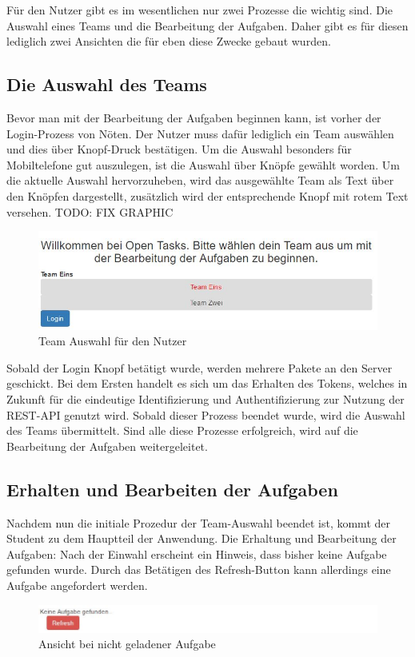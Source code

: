 Für den Nutzer gibt es im wesentlichen nur zwei Prozesse die wichtig sind. Die Auswahl eines Teams und die Bearbeitung der Aufgaben. Daher gibt es für diesen lediglich zwei Ansichten die für eben diese Zwecke gebaut wurden.

\subsection{Die Auswahl des Teams}

Bevor man mit der Bearbeitung der Aufgaben beginnen kann, ist vorher der Login-Prozess von Nöten. Der Nutzer muss dafür lediglich ein Team auswählen und dies über Knopf-Druck bestätigen. Um die Auswahl besonders für Mobiltelefone gut auszulegen, ist die Auswahl über Knöpfe gewählt worden. Um die aktuelle Auswahl hervorzuheben, wird das ausgewählte Team als Text über den Knöpfen dargestellt, zusätzlich wird der entsprechende Knopf mit rotem Text versehen.
TODO: FIX GRAPHIC
\begin{figure}[htp]     %
\centering
\includegraphics[width=1\textwidth]{bilder/UserLogin} 
\caption[Login für den Nutzer / Teamauswahl]{Team Auswahl für den Nutzer}
\end{figure} 

Sobald der Login Knopf betätigt wurde, werden mehrere Pakete an den Server geschickt. Bei dem Ersten handelt es sich um das Erhalten des Tokens, welches in Zukunft für die eindeutige Identifizierung und Authentifizierung zur Nutzung der REST-API genutzt wird. Sobald dieser Prozess beendet wurde, wird die Auswahl des Teams übermittelt. Sind alle diese Prozesse erfolgreich, wird auf die Bearbeitung der Aufgaben weitergeleitet. 

\subsection{Erhalten und Bearbeiten der Aufgaben}

Nachdem nun die initiale Prozedur der Team-Auswahl beendet ist, kommt der Student zu dem Hauptteil der Anwendung. Die Erhaltung und Bearbeitung der Aufgaben: Nach der Einwahl erscheint ein Hinweis, dass bisher keine Aufgabe gefunden wurde. Durch das Betätigen des Refresh-Button kann allerdings eine Aufgabe angefordert werden. \\
\begin{figure}[htp]     %
\centering
\includegraphics[width=1\textwidth]{bilder/NoTask} 
\caption[Ansicht bei nicht geladener Aufgabe]{Ansicht bei nicht geladener Aufgabe}
\end{figure} 

